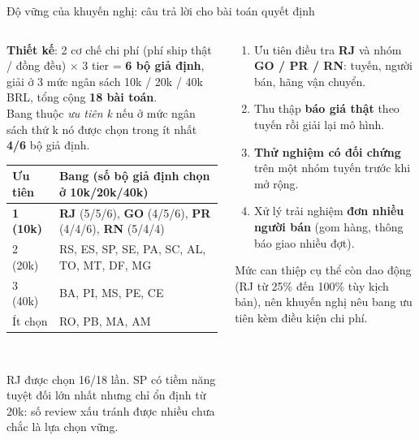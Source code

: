 \documentclass[aspectratio=169,10pt,xcolor=table]{beamer}
\begin{document}
\begin{frame}{Độ vững của khuyến nghị: câu trả lời cho bài toán quyết định}
  \begin{columns}[T]
    \begin{column}{0.56\textwidth}
      \footnotesize
      \textbf{Thiết kế}: 2 cơ chế chi phí (phí ship thật / đồng đều) $\times$ 3 tier = \textbf{6 bộ giả định}, giải ở 3 mức ngân sách 10k / 20k / 40k BRL, tổng cộng \textbf{18 bài toán}.\\
      Bang thuộc \emph{ưu tiên k} nếu ở mức ngân sách thứ k nó được chọn trong ít nhất \textbf{4/6} bộ giả định.\\[0.15cm]
      \renewcommand{\arraystretch}{1.2}
      \begin{tabular}{@{}lP{6.2cm}@{}}
        \toprule
        Ưu tiên & Bang (số bộ giả định chọn ở 10k/20k/40k)\\
        \midrule
        \textcolor{accent}{\textbf{1 (10k)}} & \textbf{RJ} (5/5/6), \textbf{GO} (4/5/6), \textbf{PR} (4/4/6), \textbf{RN} (5/4/4)\\
        2 (20k) & RS, ES, SP, SE, PA, SC, AL, TO, MT, DF, MG\\
        3 (40k) & BA, PI, MS, PE, CE\\
        Ít chọn & RO, PB, MA, AM\\
        \bottomrule
      \end{tabular}\\[0.1cm]
      {\scriptsize RJ được chọn 16/18 lần. SP có tiềm năng tuyệt đối lớn nhất nhưng chỉ ổn định từ 20k: số review xấu tránh được nhiều chưa chắc là lựa chọn vững.\par}
    \end{column}
    \begin{column}{0.41\textwidth}
      \begin{keybox}[title={Đề xuất quản lý},coltitle=white,colbacktitle=bkblue,fonttitle=\small\bfseries]
        \begin{enumerate}\setlength{\itemsep}{1pt}
          \item Ưu tiên điều tra \textbf{RJ} và nhóm \textbf{GO / PR / RN}: tuyến, người bán, hãng vận chuyển.
          \item Thu thập \textbf{báo giá thật} theo tuyến rồi giải lại mô hình.
          \item \textbf{Thử nghiệm có đối chứng} trên một nhóm tuyến trước khi mở rộng.
          \item Xử lý trải nghiệm \textbf{đơn nhiều người bán} (gom hàng, thông báo giao nhiều đợt).
        \end{enumerate}
      \end{keybox}
      {\scriptsize Mức can thiệp cụ thể còn dao động (RJ từ 25\% đến 100\% tùy kịch bản), nên khuyến nghị nêu bang ưu tiên kèm điều kiện chi phí.\par}
    \end{column}
  \end{columns}
\end{frame}
\end{document}
